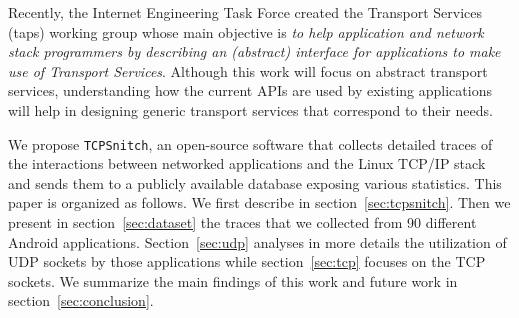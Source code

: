 Recently, the Internet Engineering Task Force created the 
Transport Services (taps) working group whose main objective is
\emph{to help application and network 
stack programmers by describing an (abstract) interface for applications 
to make use of Transport Services}. Although this work will focus on
abstract transport services, understanding how the current APIs
are used by existing applications will help in designing generic transport
services that correspond to their needs.

We propose \texttt{TCPSnitch}, an open-source software that collects
detailed traces of the interactions between networked applications and
the Linux TCP/IP stack and sends them to a publicly available database exposing
various statistics. This paper is organized as follows. We first
describe \tcpsnitch in section~\ref{sec:tcpsnitch}. Then we present in
section~\ref{sec:dataset} the traces that we collected from 90
different Android applications. Section~\ref{sec:udp} analyses in more
details the utilization of UDP sockets by those applications while
section~\ref{sec:tcp} focuses on the TCP sockets. We summarize the
main findings of this work and future work in section~\ref{sec:conclusion}.
